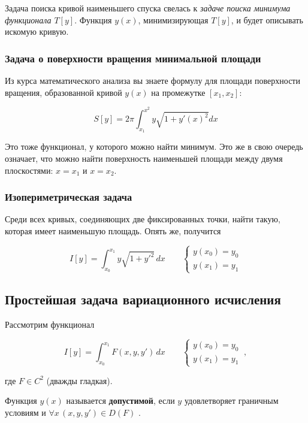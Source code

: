 \documentclass[12pt]{article}
\begin{document}
			Задача поиска кривой наименьшего спуска свелась к \textit{задаче поиска минимума функционала
			$T[y]$}. Функция $y(x)$, минимизирующая $T[y]$, и будет описывать искомую кривую.

		\subsubsection{Задача о поверхности вращения минимальной площади}

			Из курса математического анализа вы знаете формулу для площади поверхности вращения, образованной
			кривой $y(x)$ на промежутке $[x_1, x_2]$:

				$$S[y] = 2 \pi \int_{x_1}^{x^2} y \sqrt{1+y'(x)^2} dx$$

			Это тоже функционал, у которого можно найти минимум. Это же в свою очередь означает, что можно
			найти поверхность наименьшей площади между двумя плоскостями: $x=x_1$ и $x=x_2$.

		\subsubsection{Изопериметрическая задача}

	

			Среди всех кривых, соединяющих две фиксированных точки, найти такую, которая имеет наименьшую
			площадь. Опять же, получится
	
			$$I[y] = \int_{x_0}^{x_1} y\sqrt{1 + y'^2}\,dx \qquad \left\{
			\begin{aligned}
				y(x_0) = y_0 \\
				y(x_1) = y_1
			\end{aligned}
			\right.$$
	
	\subsection{Простейшая задача вариационного исчисления}
	
		Рассмотрим функционал
 
		$$I[y] = \int_{x_0}^{x_1} F(x,y,y') \,dx \qquad \left\{
		\begin{aligned}
			y(x_0) = y_0 \\
			y(x_1) = y_1
		\end{aligned}
		\right. ~ ,$$
	
		где $F\in C^2$ (дважды гладкая).

		\begin{defi}
			Функция $y(x)$ называется \textbf{допустимой}, если $y$ удовлетворяет граничным условиям и
			$\forall x\, (x, y, y')\in D(F)$ .
		\end{defi}
\end{document}
